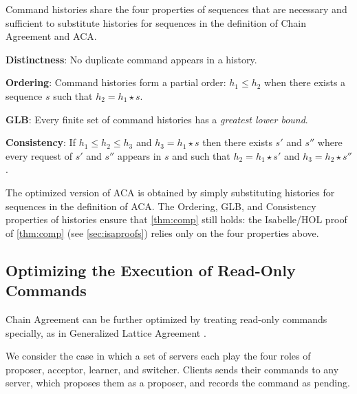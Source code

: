 Command histories share the four properties of sequences that are
necessary and sufficient to substitute histories for sequences in the
definition of Chain Agreement and ACA.
\begin{compactitem}
    \item[\textbf{Distinctness}:] No duplicate command appears in a history. 
    \item[\textbf{Ordering}:] Command histories form a partial order:
        $h_1 \leq h_2$ when there exists a sequence $s$ such that $h_2
        = h_1 \star s$.
    \item[\textbf{GLB}:] Every finite set of command histories has a
        \emph{greatest lower bound}.
    \item[\textbf{Consistency}:] If $h_1 \leq h_2 \leq h_3$ and $h_3 =
        h_1 \star s$ then there exists $s'$ and $s''$ where every
        request of $s'$ and $s''$ appears in $s$ and such that $h_2 =
        h_1 \star s'$ and $h_3 = h_2 \star s''$.
\end{compactitem}
The optimized version of ACA is obtained by
simply substituting histories for sequences in the definition of ACA.
The Ordering, GLB, and Consistency properties of histories ensure that
\cref{thm:comp} still holds: the Isabelle/HOL proof of \cref{thm:comp} (see
\cref{sec:isaproofs}) relies only on the four properties above.

\subsection{Optimizing the Execution of Read-Only Commands}
\label{sec:readonly}

Chain Agreement can be further optimized by treating 
read-only commands specially, as in Generalized Lattice Agreement
\cite{FalerioETAL12GeneralizedLatticeAgreement}.

We consider the case in which a set of servers each play the four
roles of proposer, acceptor, learner, and switcher.
Clients sends their commands to any server, which proposes them as a
proposer, and records the command as pending.

